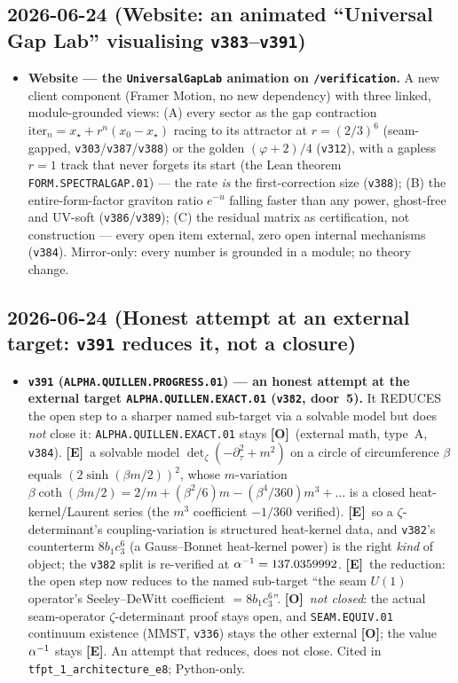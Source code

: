 \documentclass[11pt]{article}
\providecommand{\mE}{\textbf{[E]}}\providecommand{\mC}{\textbf{[C]}}
\providecommand{\mO}{\textbf{[O]}}\providecommand{\mX}{\textbf{[X]}}
\providecommand{\vref}[1]{\texttt{#1}}
\providecommand{\cthree}{c_3}\providecommand{\phiz}{\varphi_0^{\mathrm{ret}}}
\begin{document}
\subsection*{2026-06-24 (Website: an animated ``Universal Gap Lab'' visualising \texttt{v383}--\texttt{v391})}
\begin{itemize}
\item \textbf{Website --- the \texttt{UniversalGapLab} animation on \texttt{/verification}.} A new client
component (Framer Motion, no new dependency) with three linked, module-grounded views: (A) every sector as the
gap contraction $\mathrm{iter}_n=x_\star+r^n(x_0-x_\star)$ racing to its attractor at $r=(2/3)^6$ (seam-gapped,
\vref{v303}/\vref{v387}/\vref{v388}) or the golden $(\varphi+2)/4$ (\vref{v312}), with a gapless $r=1$ track that
never forgets its start (the Lean theorem \texttt{FORM.SPECTRALGAP.01}) --- the rate \emph{is} the first-correction
size (\vref{v388}); (B) the entire-form-factor graviton ratio $e^{-u}$ falling faster than any power, ghost-free and
UV-soft (\vref{v386}/\vref{v389}); (C) the residual matrix as certification, not construction --- every open item
external, zero open internal mechanisms (\vref{v384}). Mirror-only: every number is grounded in a module; no theory
change.
\end{itemize}

\subsection*{2026-06-24 (Honest attempt at an external target: \texttt{v391} reduces it, not a closure)}
\begin{itemize}
\item \textbf{\texttt{v391} (\texttt{ALPHA.QUILLEN.PROGRESS.01}) --- an honest attempt at the external target
\texttt{ALPHA.QUILLEN.EXACT.01} (\vref{v382}, door~5).} It REDUCES the open step to a sharper named sub-target via a
solvable model but does \emph{not} close it: \texttt{ALPHA.QUILLEN.EXACT.01} stays \mO\ (external math, type~A,
\vref{v384}). \mE\ a solvable model $\det_\zeta(-\partial_\tau^2+m^2)$ on a circle of circumference $\beta$ equals
$(2\sinh(\beta m/2))^2$, whose $m$-variation $\beta\coth(\beta m/2)=2/m+(\beta^2/6)m-(\beta^4/360)m^3+\dots$ is a closed
heat-kernel/Laurent series (the $m^3$ coefficient $-1/360$ verified). \mE\ so a $\zeta$-determinant's coupling-variation
is structured heat-kernel data, and \vref{v382}'s counterterm $8b_1\cthree^6$ (a Gauss--Bonnet heat-kernel power) is the
right \emph{kind} of object; the \vref{v382} split is re-verified at $\alpha^{-1}=137.0359992$. \mE\ the reduction: the open
step now reduces to the named sub-target ``the seam $U(1)$ operator's Seeley--DeWitt coefficient $=8b_1\cthree^6$''.
\mO\ \emph{not closed}: the actual seam-operator $\zeta$-determinant proof stays open, and \texttt{SEAM.EQUIV.01}
continuum existence (MMST, \vref{v336}) stays the other external \mO; the value $\alpha^{-1}$ stays \mE. An attempt that
reduces, does not close. Cited in \texttt{tfpt\_1\_architecture\_e8}; Python-only.
\end{itemize}
\end{document}

